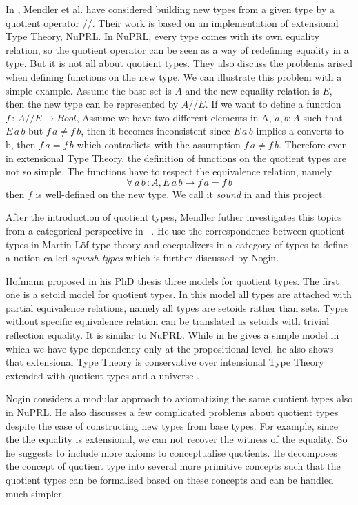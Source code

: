 \documentclass[envcountsame]{llncs}
\newcommand{\itt}{intensional Type Theory}
\newcommand{\ett}{extensional Type Theory}
\newcommand{\mltt}{Martin-L\"{o}f type theory}
\begin{document}
In \cite{cab}, Mendler et al. have considered building new types from a
given type by  a quotient operator $//$. Their work is based on an
implementation of extensional Type Theory, NuPRL. In NuPRL, every type
comes with its own equality relation, so the quotient operator can be
seen as a way of redefining equality in a type. But it is not all
about quotient types. They also discuss the problems arised when
defining functions on the new type.
We can illustrate this problem with a simple example. Assume the base
set is $A$ and the new equality relation is $E$, then the new
type can be represented by $A//E$. If we want to define a function $f
\,\colon\, A//E \to Bool$,  Assume we have two different elements in
A, $a, b \colon A$ such that $E\,a\,b$ but $f\,a \not= f\,b$, then it
becomes inconsistent since $E\,a\,b$ implies a converts to b, then
$f\,a = f\,b$ which contradicts with the assumption $f\,a \not=
f\,b$. Therefore even in \ett{}, the definition of functions on the
quotient types are not so simple. The functions have
to respect the equivalence relation, namely$$\forall \, a\,b\,\colon A, E\,a\,b \to f\,a = f\,b$$
then $f$ is well-defined on the new type. We call it \emph{sound} in
\cite{aan} and this project.

 After the introduction of quotient types, Mendler futher investigates
 this topics from a categorical perspective in ~\cite{men:90}. He use
 the correspondence between quotient types in \mltt{} and coequalizers
 in a category of types to define a notion called \emph{squash types}
 which is further discussed by Nogin.


Hofmann proposed  in his PhD thesis \cite{hof:phd} three models for
quotient types. The first one is a setoid model for
quotient types. In this model all types are attached with partial
equivalence relations, namely all types are setoids rather than
sets. Types without specific equivalence relation can be translated as setoids with trivial reflection equality. It is similar to NuPRL. While in \cite{hof:95:sm} he gives a simple model in which we have type dependency only at the propositional level, he also shows that extensional Type Theory is conservative over \itt {}  extended with quotient types and a universe \cite{hof:95:con}.

Nogin \cite{nog:02} considers a modular approach to axiomatizing the
same quotient types also in NuPRL. He also discusses a few complicated
problems about quotient types despite the ease of constructing new types
from base types. For example, since the the equality is
extensional, we can not recover the
witness of the equality. So he suggests to include more axioms to
conceptualise quotients. He decomposes the concept of quotient type
into several more primitive concepts such that the quotient types can
be formalised based on these concepts and can be handled much
simpler. 
\end{document}

